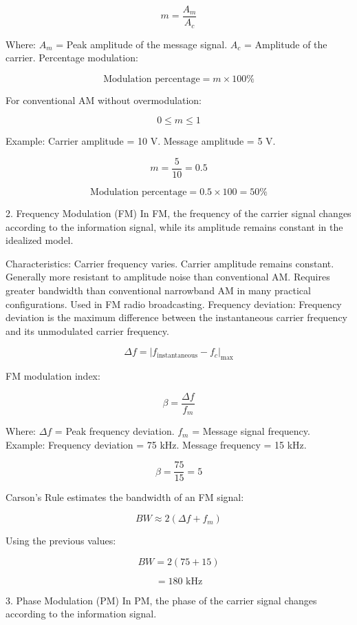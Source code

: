 \[
\boxed{m=\frac{A_m}{A_c}}
\]

Where:
$A_m$ = Peak amplitude of the message signal.
$A_c$ = Amplitude of the carrier.
Percentage modulation:

\[
\boxed{\text{Modulation percentage}=m\times100\%}
\]

For conventional AM without overmodulation:

\[
0\leq m\leq1
\]

Example:
Carrier amplitude = 10 V.
Message amplitude = 5 V.

\[
m=\frac{5}{10}=0.5
\]


\[
\text{Modulation percentage}=0.5\times100=50\%
\]

2. Frequency Modulation (FM)
In FM, the frequency of the carrier signal changes according to the information signal, while its amplitude remains constant in the idealized model.


Characteristics:
Carrier frequency varies.
Carrier amplitude remains constant.
Generally more resistant to amplitude noise than conventional AM.
Requires greater bandwidth than conventional narrowband AM in many practical configurations.
Used in FM radio broadcasting.
Frequency deviation:
Frequency deviation is the maximum difference between the instantaneous carrier frequency and its unmodulated carrier frequency.

\[
\Delta f=|f_{\text{instantaneous}}-f_c|_{\max}
\]

FM modulation index:

\[
\boxed{\beta=\frac{\Delta f}{f_m}}
\]

Where:
$\Delta f$ = Peak frequency deviation.
$f_m$ = Message signal frequency.
Example:
Frequency deviation = 75 kHz.
Message frequency = 15 kHz.

\[
\beta=\frac{75}{15}=\boxed{5}
\]

Carson's Rule estimates the bandwidth of an FM signal:

\[
\boxed{BW\approx2(\Delta f+f_m)}
\]

Using the previous values:

\[
BW=2(75+15)
\]


\[
=\boxed{180\text{ kHz}}
\]

3. Phase Modulation (PM)
In PM, the phase of the carrier signal changes according to the information signal.


